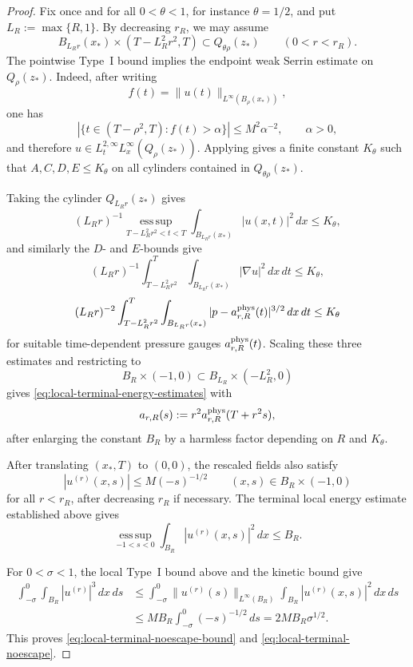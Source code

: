 \documentclass[11pt]{amsart}
\numberwithin{equation}{section}
\theoremstyle{plain}
\theoremstyle{definition}
\theoremstyle{remark}
\newcommand{\esssup}{\operatorname*{ess\,sup}}
\begin{document}
\begin{proof}
Fix once and for all \(0<\theta<1\), for instance \(\theta=1/2\), and put
\(L_R:=\max\{R,1\}\).  By decreasing \(r_R\), we may assume
\[
   B_{L_Rr}(x_*)\times(T-L_R^2r^2,T)\subset Q_{\theta\rho}(z_*)
   \qquad (0<r<r_R).
\]
The pointwise Type~I bound implies the endpoint weak Serrin estimate on
\(Q_\rho(z_*)\).  Indeed, after writing
\[
   f(t)=\|u(t)\|_{L^\infty(B_\rho(x_*))},
\]
one has
\[
   |\{t\in(T-\rho^2,T): f(t)>\alpha\}|
   \le M^2\alpha^{-2},
   \qquad \alpha>0,
\]
and therefore \(u\in L^{2,\infty}_tL^\infty_x(Q_\rho(z_*))\).  Applying
 gives a finite constant \(K_\theta\)
such that \(A,C,D,E\le K_\theta\) on all cylinders contained in
\(Q_{\theta\rho}(z_*)\).

Taking the cylinder \(Q_{L_Rr}(z_*)\) gives
\[
   (L_Rr)^{-1}
   \esssup_{T-L_R^2r^2<t<T}
      \int_{B_{L_Rr}(x_*)}|u(x,t)|^2\,dx
   \le K_\theta ,
\]
and similarly the \(D\)- and \(E\)-bounds give
\[
   (L_Rr)^{-1}\int_{T-L_R^2r^2}^{T}
      \int_{B_{L_Rr}(x_*)}|\nabla u|^2\,dx\,dt
   \le K_\theta ,
\]
\[
   (L_Rr)^{-2}\int_{T-L_R^2r^2}^{T}
      \int_{B_{L_Rr}(x_*)}|p-a_{r,R}^{\rm phys}(t)|^{3/2}\,dx\,dt
   \le K_\theta
\]
for suitable time-dependent pressure gauges \(a_{r,R}^{\rm phys}(t)\).  Scaling
these three estimates and restricting to
\[
   B_R\times(-1,0)\subset B_{L_R}\times(-L_R^2,0)
\]
gives \eqref{eq:local-terminal-energy-estimates} with
\[
   a_{r,R}(s):=r^2a_{r,R}^{\rm phys}(T+r^2s),
\]
after enlarging the constant \(B_R\) by a harmless factor depending on \(R\)
and \(K_\theta\).

After translating \((x_*,T)\) to \((0,0)\), the rescaled fields also satisfy
\[
   |u^{(r)}(x,s)|\le M(-s)^{-1/2}
   \qquad (x,s)\in B_R\times(-1,0)
\]
for all \(r<r_R\), after decreasing \(r_R\) if necessary.  The terminal local
energy estimate established above gives
\[
   \esssup_{-1<s<0}\int_{B_R}|u^{(r)}(x,s)|^2\,dx\le B_R .
\]

For \(0<\sigma<1\), the local Type~I bound above and the kinetic bound give
\[
\begin{aligned}
  \int_{-\sigma}^{0}\int_{B_R}|u^{(r)}|^3\,dx\,ds
  &\le
  \int_{-\sigma}^{0}
     \|u^{(r)}(s)\|_{L^\infty(B_R)}
     \int_{B_R}|u^{(r)}(x,s)|^2\,dx\,ds  \\
  &\le
  MB_R\int_{-\sigma}^{0}(-s)^{-1/2}\,ds
  =
  2MB_R\sigma^{1/2}.
\end{aligned}
\]
This proves \eqref{eq:local-terminal-noescape-bound} and
\eqref{eq:local-terminal-noescape}.
\end{proof}
\end{document}
